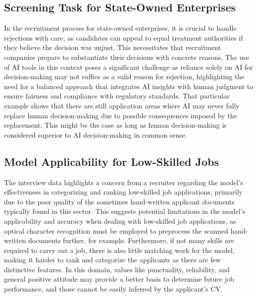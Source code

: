 \documentclass[draft,final]{thesisclass} %
\begin{document}
\subsection{Screening Task for State-Owned Enterprises}
In the recruitment process for state-owned enterprises, it is crucial to handle rejections with care, as candidates can appeal to equal treatment authorities if they believe the decision was unjust. This necessitates that recruitment companies prepare to substantiate their decisions with concrete reasons. The use of \acs{AI} tools in this context poses a significant challenge as reliance solely on \acs{AI} for decision-making may not suffice as a valid reason for rejection, highlighting the need for a balanced approach that integrates \acs{AI} insights with human judgment to ensure fairness and compliance with regulatory standards. That particular example shows that there are still application areas where \acs{AI} may never fully replace human decision-making due to possible consequences imposed by the replacement.
This might be the case as long as human decision-making is considered superior to \acs{AI} decision-making in common sense.

\subsection{Model Applicability for Low-Skilled Jobs}
The interview data highlights a concern from a recruiter regarding the model's effectiveness in categorizing and ranking low-skilled job applications, primarily due to the poor quality of the sometimes hand-written applicant documents typically found in this sector. This suggests potential limitations in the model's applicability and accuracy when dealing with low-skilled job applications, as optical character recognition must be employed to preprocess the scanned hand-written documents further, for example. Furthermore, if not many skills are required to carry out a job, there is also little matching work for the model, making it harder to rank and categorize the applicants as there are few distinctive features. In this domain, values like punctuality, reliability, and general positive attitude may provide a better basis to determine future job performance, and those cannot be easily inferred by the applicant's \acs{CV}.
\end{document}
